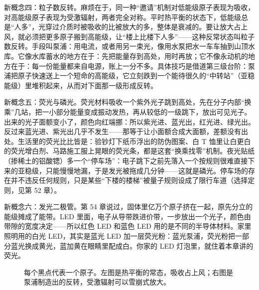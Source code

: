 \begin{mainline}
新概念四：粒子数反转。麻烦在于，同一种“邀请”机制对低能级原子表现为吸收，对高能级原子表现为受激辐射，两者完全对称。平时热平衡的状态下，低能级总是“人多”，光穿过介质时被吸收的比被放大的多，整体是衰减的。要让放大占上风，就必须把更多原子搬到高能级，让“楼上比楼下人多”——这种反常状态叫粒子数反转。手段叫泵浦：用电流，或者用另一束光，像用水泵把水一车车抽到山顶水库。它像水库蓄水的地方在于：先把能量存到高处，用时再放；它不像永动机的地方在于：每一份能量都来自电源，账上一分不多。具体技巧是借道第三级台阶：泵浦把原子快速送上一个短命的高能级，它立刻跌到一个能待很久的“中转站”（亚稳能级）里堆积起来，从而对下面那一级形成反转。

新概念五：荧光与磷光。荧光材料吸收一个紫外光子跳到高处，先在分子内部“换乘”几站，把一小部分能量变成振动发热，再从较低的一级跳下，放出可见光子。出来的光子面额变小了，颜色向红端挪：所以紫光进、蓝光出，红光进、绿光出。反过来蓝光进、紫光出几乎不发生——那等于让小面额合成大面额，差额没有出处。生活里的荧光比比皆是：验钞灯下纸币浮出的防伪图案、白 T 恤里让白更白的荧光增白剂、马路施工服上晃眼的荧光条，都是这套“换乘找零”机制。夜光贴纸（掺稀土的铝酸锶）多一个“停车场”：电子跳下之前先落入一个按规则很难直接下来的亚稳级，只能慢慢地漏，于是发光被拖成几分钟——这就是磷光。停车场的存在并不违反任何规则，只是某些“下楼的楼梯”被量子规则设成了限行车道（选择定则，见第 52 章）。

新概念六：发光二极管。第 54 章说过，固体里亿万个原子挤在一起，原先分立的能级摊成了能带。LED 里面，电子从导带跌进价带，一步放出一个光子，颜色由带隙的宽度决定——所以红色 LED 和蓝色 LED 用的是不同的半导体材料。家里照明用的白光 LED，其实是蓝光 LED 加一层荧光粉：蓝光泵浦，荧光粉把一部分蓝光换成黄光，蓝加黄在眼睛里配成白。你家的 LED 灯泡里，就住着本章讲的荧光。
\end{mainline}

\begin{figure}[htbp]
\centering
{}
\caption{每个黑点代表一个原子。左图是热平衡的常态，吸收占上风；右图是泵浦制造出的反转，受激辐射可以雪崩式放大。}
\end{figure}

